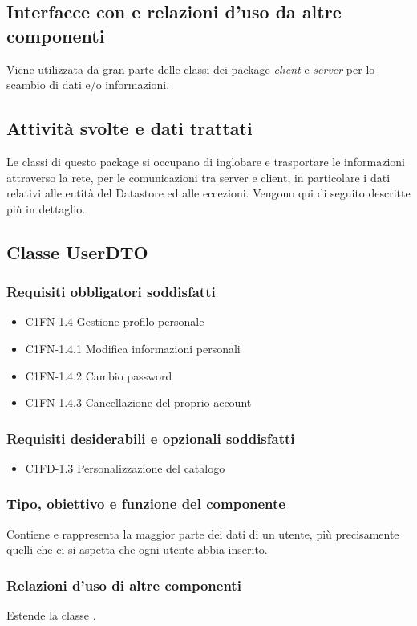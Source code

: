 \subsection*{Interfacce con e relazioni d'uso da altre componenti} Viene
utilizzata da gran parte delle classi dei package \emph{client} e \emph{server}
per lo scambio di dati e/o informazioni. 
\subsection*{Attivit\`a svolte e dati trattati}
Le classi di questo package si occupano di inglobare e trasportare
le informazioni attraverso la rete, per le comunicazioni tra server e client,
in particolare i dati relativi alle entit\`a del Datastore ed alle eccezioni.
Vengono qui di seguito descritte pi\`u in dettaglio.

\subsection{Classe UserDTO}
\subsubsection*{Requisiti obbligatori soddisfatti}
\begin{itemize}
	\item C1FN-1.4 Gestione profilo personale
	\item C1FN-1.4.1 Modifica informazioni personali
	\item C1FN-1.4.2 Cambio password
	\item C1FN-1.4.3 Cancellazione del proprio account
\end{itemize}
\subsubsection*{Requisiti desiderabili e opzionali soddisfatti}
\begin{itemize}
    \item C1FD-1.3 Personalizzazione del catalogo
\end{itemize}
\subsubsection*{Tipo, obiettivo e funzione del componente}
Contiene e rappresenta la maggior parte dei dati di un utente, pi\`u
precisamente quelli che ci si aspetta che ogni utente abbia inserito.
\subsubsection*{Relazioni d'uso di altre componenti}
Estende la classe .
